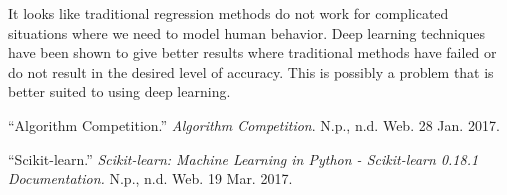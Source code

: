 \documentclass[paper=a4, fontsize=11pt]{scrartcl} %
\numberwithin{equation}{section} %
\numberwithin{table}{section} %
\begin{document}
It looks like traditional regression methods do not work for complicated situations where we need to model human behavior. Deep learning techniques have been shown to give better results where traditional methods have failed or do not result in the desired level of accuracy. This is possibly a problem that is better suited to using deep learning.

\begin{thebibliography}{1}

\enquote{Algorithm Competition.} \textit{Algorithm Competition}. N.p., n.d. Web. 28 Jan. 2017.

\enquote{Scikit-learn.} \textit{Scikit-learn: Machine Learning in Python - Scikit-learn 0.18.1 Documentation.} N.p., n.d. Web. 19 Mar. 2017.

\end{thebibliography}
\end{document}
